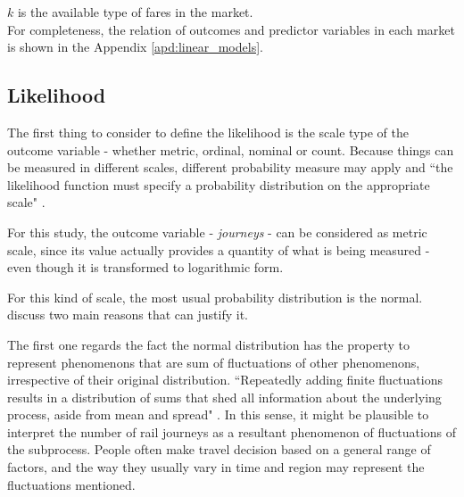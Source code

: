 $k$ is the available type of fares in the market.
\\[3pt]

For completeness, the relation of outcomes and predictor variables in each market is shown in the Appendix \ref{apd:linear_models}.


% 

\subsection{Likelihood}

The first thing to consider to define the likelihood is the scale type of the outcome variable - whether metric, ordinal, nominal or count. Because things can be measured in different scales, different probability measure may apply and ``the likelihood function must specify a probability distribution on the appropriate scale" \citep[p.~423]{kruschke2014}.

For this study, the outcome variable - \textit{journeys} - can be considered as metric scale, since its value actually provides a quantity of what is being measured - even though it is transformed to logarithmic form. 

For this kind of scale, the most usual probability distribution is the normal. \cite{mcelreath2012} discuss two main reasons that can justify it.

The first one regards the fact the normal distribution has the property to represent phenomenons that are sum of fluctuations of other phenomenons, irrespective of their original distribution. ``Repeatedly adding finite fluctuations results in a distribution of sums that shed all information about the underlying process, aside from mean and spread" \citep[p.~75]{mcelreath2012}. In this sense, it might be plausible to interpret the number of rail journeys as a resultant phenomenon of fluctuations of the subprocess. People often make travel decision based on a general range of factors, and the way they usually vary in time and region may represent the fluctuations mentioned.

